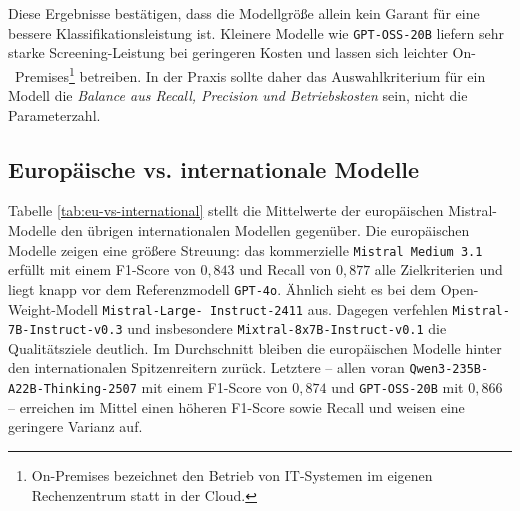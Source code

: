 Diese Ergebnisse bestätigen, dass die Modellgröße allein kein Garant für eine bessere Klassifikationsleistung ist. Kleinere Modelle wie \texttt{GPT-OSS-20B} liefern sehr starke Screening-Leistung bei geringeren Kosten und lassen sich leichter On-\linebreak~Premises\footnote{
On-Premises bezeichnet den Betrieb von IT-Systemen im eigenen Rechenzentrum statt in der Cloud.
} betreiben. In der Praxis sollte daher das Auswahlkriterium für ein Modell die \emph{Balance aus Recall, Precision und Betriebskosten} sein, nicht die Parameterzahl.

\subsection*{Europäische vs. internationale Modelle}

Tabelle \ref{tab:eu-vs-international} stellt die Mittelwerte der europäischen Mistral-Modelle den übrigen internationalen Modellen gegenüber. Die europäischen Modelle zeigen eine größere Streuung: das kommerzielle \texttt{Mistral Medium 3.1} erfüllt mit einem F1-Score von $0{,}843$ und Recall von $0{,}877$ alle Zielkriterien und liegt knapp vor dem Referenzmodell \texttt{GPT-4o}. Ähnlich sieht es bei dem Open-Weight-Modell \texttt{Mistral-Large-\linebreak~Instruct-2411} aus. Dagegen verfehlen \texttt{Mistral-7B-Instruct-v0.3} und insbesondere \texttt{Mixtral-8x7B-Instruct-v0.1} die Qualitätsziele deutlich. Im Durchschnitt bleiben die europäischen Modelle hinter den internationalen Spitzenreitern zurück. Letztere – allen voran \texttt{Qwen3-235B-A22B-Thinking-2507} mit einem F1-Score von $0{,}874$ und \texttt{GPT-OSS-20B} mit $0{,}866$ – erreichen im Mittel einen höheren F1-Score sowie Recall und weisen eine geringere Varianz auf.

